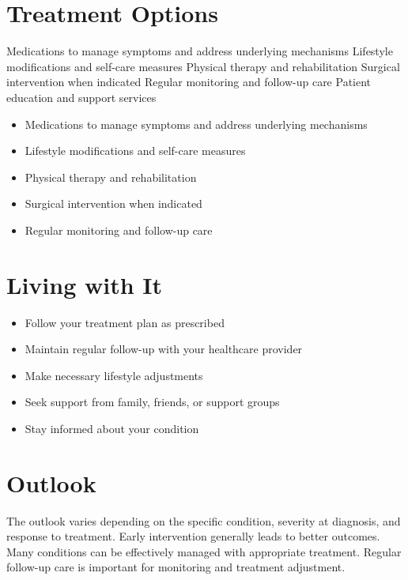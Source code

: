 \section{Treatment Options}
Medications to manage symptoms and address underlying mechanisms Lifestyle modifications and self-care measures Physical therapy and rehabilitation Surgical intervention when indicated Regular monitoring and follow-up care Patient education and support services

\begin{itemize}[noitemsep]
  \item Medications to manage symptoms and address underlying mechanisms
  \item Lifestyle modifications and self-care measures
  \item Physical therapy and rehabilitation
  \item Surgical intervention when indicated
  \item Regular monitoring and follow-up care
\end{itemize}
\section{Living with It}
\begin{itemize}[noitemsep]
  \item Follow your treatment plan as prescribed
  \item Maintain regular follow-up with your healthcare provider
  \item Make necessary lifestyle adjustments
  \item Seek support from family, friends, or support groups
  \item Stay informed about your condition
\end{itemize}
\section{Outlook}
The outlook varies depending on the specific condition, severity at diagnosis, and response to treatment. Early intervention generally leads to better outcomes. Many conditions can be effectively managed with appropriate treatment. Regular follow-up care is important for monitoring and treatment adjustment.
